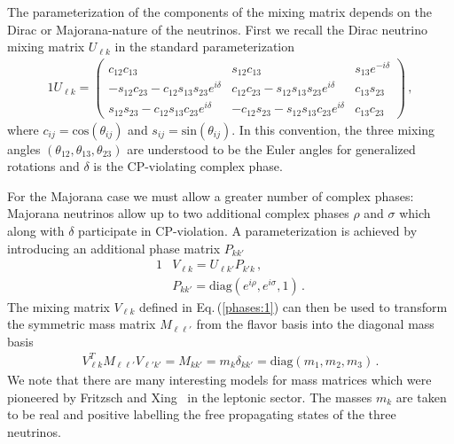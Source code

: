 \documentclass{ws-ijmpa}
\newcommand{\req}[1]{Eq.\,(\ref{#1})}
\begin{document}
The parameterization of the components of the mixing matrix depends on the Dirac or Majorana-nature of the neutrinos. First we recall the Dirac neutrino mixing matrix $U_{\ell k}$ in the standard parameterization~\cite{Schwartz:2014sze} 
\begin{alignat}{1}
\label{rotation:1} U_{\ell k} =
\begin{pmatrix}
 c_{12}c_{13} & s_{12}c_{13} & s_{13}e^{-i\delta}\\
 -s_{12}c_{23} - c_{12}s_{13}s_{23}e^{i\delta} & c_{12}c_{23} - s_{12}s_{13}s_{23}e^{i\delta} & c_{13}s_{23}\\
 s_{12}s_{23} - c_{12}s_{13}c_{23}e^{i\delta}& -c_{12}s_{23} - s_{12}s_{13}c_{23}e^{i\delta} & c_{13}c_{23}
\end{pmatrix}\,,
\end{alignat}
where $c_{ij} = \mathrm{cos}(\theta_{ij})$ and $s_{ij} = \mathrm{sin}(\theta_{ij})$. In this convention, the three mixing angles $(\theta_{12}, \theta_{13}, \theta_{23})$ are understood to be the Euler angles for generalized rotations and $\delta$ is the CP-violating complex phase. 

For the Majorana case we must allow a greater number of complex phases: Majorana neutrinos allow up to two additional complex phases $\rho$ and $\sigma$ which along with $\delta$ participate in CP-violation. A parameterization is achieved by introducing an additional phase matrix $P_{kk'}$
\begin{alignat}{1}
\label{phases:1} &V_{\ell k} = U_{\ell k'}P_{k'k}\,,\\
\label{phases:3} &P_{kk'} = \mathrm{diag}(e^{i\rho},e^{i\sigma},1)\,.
\end{alignat}
The mixing matrix $V_{\ell k}$ defined in \req{phases:1} can then be used to transform the symmetric mass matrix $M_{\ell\ell'}$ from the flavor basis into the diagonal mass basis 
\begin{align}
\label{diag:1}
V_{\ell k}^{T}M_{\ell\ell'}V_{\ell'k'} = M_{kk'} = m_{k}\delta_{kk'} = \mathrm{diag}(m_{1},m_{2},m_{3})\,.
\end{align}
We note that there are many interesting models for mass matrices which were pioneered by Fritzsch and Xing~\cite{Fritzsch:1995dj,Fritzsch:1998xs,Fritzsch:1999ee,Xing:2000ik} in the leptonic sector. The masses $m_{k}$ are taken to be real and positive labelling the free propagating states of the three neutrinos.

\end{document}
